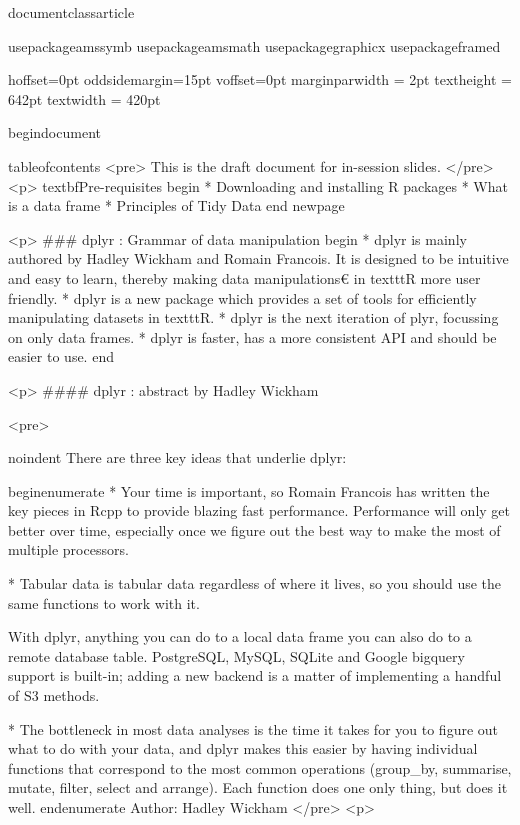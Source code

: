 documentclass{article}

usepackage{amssymb}
usepackage{amsmath}
usepackage{graphicx}
usepackage{framed}

hoffset=0pt
oddsidemargin=15pt
voffset=0pt
marginparwidth = 2pt
textheight = 642pt
textwidth = 420pt

begin{document}
	
	tableofcontents
	<pre>
		This is the draft document for in-session slides.
	</pre>
<p>
	textbf{Pre-requisites}
	begin{ }
		         * Downloading and installing R packages
		         * What is a data frame
		         * Principles of Tidy Data
	end{ }
	newpage
	
	
	
	
	<p>
### {dplyr : Grammar of data manipulation}
	begin{ }
		         * dplyr  is mainly authored by Hadley Wickham and Romain Francois. It is designed to be intuitive and easy to learn, thereby making data manipulations€ in texttt{R} more user friendly.
		         * dplyr is a new package which provides a set of tools for efficiently manipulating datasets in texttt{R}.
		         * dplyr is the next iteration of plyr, focussing on only data frames.          * dplyr is faster, has a more consistent API and should be easier to use. 
	end{ }
	
	
	<p>
#### {dplyr : abstract by Hadley Wickham}
	
	<pre>
		
		
		noindent There are three key ideas that underlie dplyr:
		
		begin{enumerate}
			         * Your time is important, so Romain Francois has written the key pieces in Rcpp to provide blazing fast performance. Performance will only get better over time, especially once we figure out the best way to make the most of multiple processors. 
			
			         * Tabular data is tabular data regardless of where it lives, so you should use the same functions to work with it. 
			
			With dplyr, anything you can do to a local data frame you can also do to a remote database table. PostgreSQL, MySQL, SQLite and Google bigquery support is built-in; adding a new backend is a matter of implementing a handful of S3 methods. 
			
			         * The bottleneck in most data analyses is the time it takes for you to figure out what to do with your data, and dplyr makes this easier by having individual functions that correspond to the most common operations  (group_by, summarise, mutate, filter, select and arrange). Each function does one only thing, but does it well.
		end{enumerate}
		Author: Hadley Wickham
	</pre>
<p>
	

